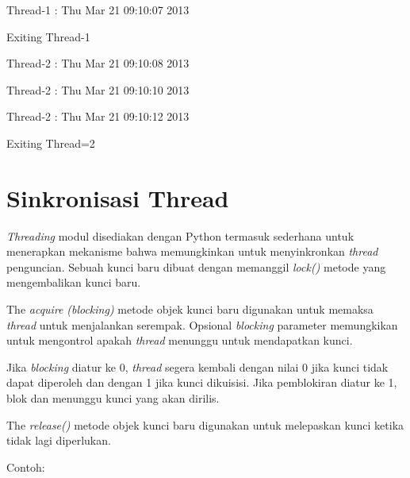 \documentclass [12pt,a4paper,notitlepage,oneside,bahasa]{article}
\begin{document}
\noindent 
{\fontsize{10pt}{10pt}\selectfont Thread-1 : Thu Mar 21 09:10:07 2013} \par
\noindent 
{\fontsize{10pt}{10pt}\selectfont Exiting Thread-1} \par
\noindent 
{\fontsize{10pt}{10pt}\selectfont Thread-2 : Thu Mar 21 09:10:08 2013} \par
\noindent 
{\fontsize{10pt}{10pt}\selectfont Thread-2 : Thu Mar 21 09:10:10 2013} \par
\noindent 
{\fontsize{10pt}{10pt}\selectfont Thread-2 : Thu Mar 21 09:10:12 2013} \par
\noindent 
{\fontsize{10pt}{10pt}\selectfont Exiting Thread=2} \par
\vspace{10pt}

\section{Sinkronisasi Thread}
\textit{Threading} modul disediakan dengan Python termasuk sederhana untuk menerapkan mekanisme bahwa memungkinkan untuk menyinkronkan \textit{thread}\textit{ }penguncian. Sebuah kunci baru dibuat dengan memanggil \textit{lock() }metode yang mengembalikan kunci baru. \par
The \textit{acquire}\textit{ }\textit{(blocking)}\textit{ }metode objek kunci baru digunakan untuk memaksa \textit{thread}\textit{ }untuk menjalankan serempak. Opsional \textit{blocking} parameter memungkikan untuk mengontrol apakah\textit{ thread} menunggu untuk mendapatkan kunci. \par
Jika \textit{blocking} diatur ke 0, \textit{thread} segera kembali dengan nilai 0 jika kunci tidak dapat diperoleh dan dengan 1 jika kunci dikuisisi. Jika pemblokiran diatur ke 1, blok dan menunggu kunci yang akan dirilis. \par
The \textit{release()} metode objek kunci baru digunakan untuk melepaskan kunci ketika tidak lagi diperlukan.  \par
\noindent 
Contoh:
\end{document}
